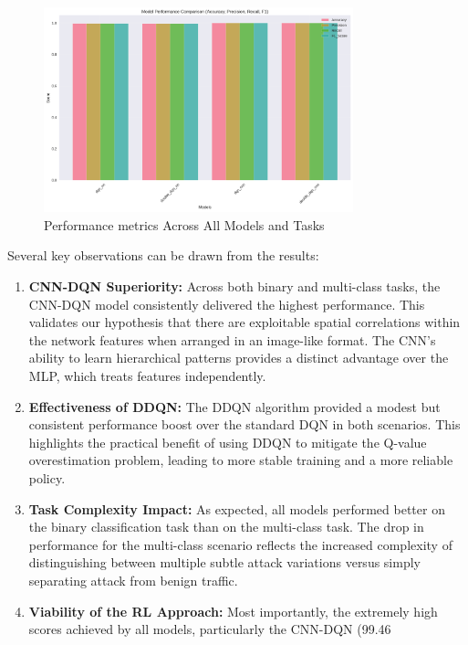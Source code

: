 \documentclass[12pt]{report}
\begin{document}
\begin{figure}[H]
    \centering
    \includegraphics[width=0.8\textwidth]{images/performance_metrics_comparison.png} %
    \caption{Performance metrics Across All Models and Tasks}
    \label{fig:performance_metrics_comparison}
\end{figure}

Several key observations can be drawn from the results:
\begin{enumerate}
    \item \textbf{CNN-DQN Superiority:} Across both binary and multi-class tasks, the CNN-DQN model consistently delivered the highest performance. This validates our hypothesis that there are exploitable spatial correlations within the network features when arranged in an image-like format. The CNN's ability to learn hierarchical patterns provides a distinct advantage over the MLP, which treats features independently.
    \item \textbf{Effectiveness of DDQN:} The DDQN algorithm provided a modest but consistent performance boost over the standard DQN in both scenarios. This highlights the practical benefit of using DDQN to mitigate the Q-value overestimation problem, leading to more stable training and a more reliable policy.
    \item \textbf{Task Complexity Impact:} As expected, all models performed better on the binary classification task than on the multi-class task. The drop in performance for the multi-class scenario reflects the increased complexity of distinguishing between multiple subtle attack variations versus simply separating attack from benign traffic.
    \item \textbf{Viability of the RL Approach:} Most importantly, the extremely high scores achieved by all models, particularly the CNN-DQN (99.46%
\end{enumerate}
\end{document}
